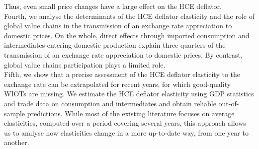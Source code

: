 \documentclass[11pt,a4paper]{paper} %
\begin{document}
Thus, even small price changes have a large effect on the HCE deflator. \\
Fourth, we analyse the determinants of the HCE deflator elasticity and the role of global value chains in the transmission of an exchange rate appreciation to domestic prices.
On the whole, direct effects through imported consumption and intermediates entering domestic production explain three-quarters of the transmission of an exchange rate appreciation to domestic prices.
By contrast, global value chains participation plays a limited role. \\
Fifth, we show that a precise assessment of the HCE deflator elasticity to the exchange rate can be extrapolated for recent years, for which good-quality WIOTs are missing. 
We estimate the HCE deflator elasticity using GDP statistics and trade data on consumption and intermediates and obtain reliable out-of-sample predictions.
While most of the existing literature focuses on average elasticities, computed over a period covering several years, this approach allows us to analyse how elasticities change in a more up-to-date way, from one year to another. 
\end{document}
